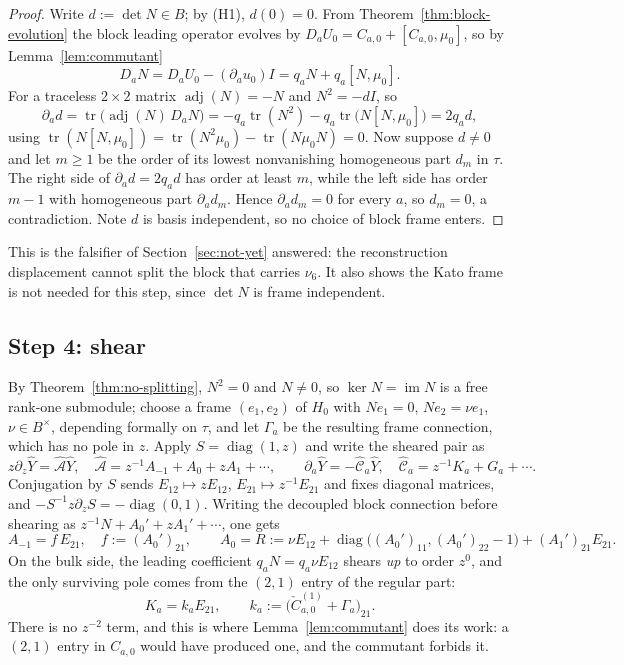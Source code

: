 \documentclass[11pt]{article}
\theoremstyle{definition}
\theoremstyle{remark}
\begin{document}
\begin{proof}
Write $d:=\det N\in B$; by (H1), $d(0)=0$. From
Theorem~\ref{thm:block-evolution} the block leading operator evolves by
$D_aU_0=C_{a,0}+[C_{a,0},\mu_0]$, so by Lemma~\ref{lem:commutant}
\[
  D_aN=D_aU_0-(\partial_au_0)I=q_aN+q_a[N,\mu_0].
\]
For a traceless $2\times2$ matrix $\operatorname{adj}(N)=-N$ and
$N^2=-dI$, so
\[
  \partial_ad=\operatorname{tr}\bigl(\operatorname{adj}(N)\,D_aN\bigr)
  =-q_a\operatorname{tr}(N^2)-q_a\operatorname{tr}\bigl(N[N,\mu_0]\bigr)
  =2q_ad,
\]
using $\operatorname{tr}(N[N,\mu_0])=\operatorname{tr}(N^2\mu_0)
-\operatorname{tr}(N\mu_0N)=0$. Now suppose $d\ne0$ and let $m\ge1$ be the
order of its lowest nonvanishing homogeneous part $d_m$ in $\tau$. The right
side of $\partial_ad=2q_ad$ has order at least $m$, while the left side has
order $m-1$ with homogeneous part $\partial_ad_m$. Hence $\partial_ad_m=0$ for
every $a$, so $d_m=0$, a contradiction. Note $d$ is basis independent, so no
choice of block frame enters.
\end{proof}

This is the falsifier of Section~\ref{sec:not-yet} answered: the reconstruction
displacement cannot split the block that carries $\nu_6$. It also shows the
Kato frame is not needed for this step, since $\det N$ is frame independent.

\subsection*{Step 4: shear}

By Theorem~\ref{thm:no-splitting}, $N^2=0$ and $N\ne0$, so $\ker N=\operatorname{im}N$
is a free rank-one submodule; choose a frame $(e_1,e_2)$ of $H_0$ with
$Ne_1=0$, $Ne_2=\nu e_1$, $\nu\in B^\times$, depending formally on $\tau$, and
let $\Gamma_a$ be the resulting frame connection, which has no pole in $z$.
Apply $S=\operatorname{diag}(1,z)$ and write the sheared pair as
\[
  z\partial_z\widehat Y=\widehat{\mathcal A}\widehat Y,\quad
  \widehat{\mathcal A}=z^{-1}A_{-1}+A_0+zA_1+\cdots,
  \qquad
  \partial_a\widehat Y=-\widehat{\mathcal C}_a\widehat Y,\quad
  \widehat{\mathcal C}_a=z^{-1}K_a+G_a+\cdots.
\]
Conjugation by $S$ sends $E_{12}\mapsto zE_{12}$, $E_{21}\mapsto z^{-1}E_{21}$
and fixes diagonal matrices, and $-S^{-1}z\partial_zS=-\operatorname{diag}(0,1)$.
Writing the decoupled block connection before shearing as
$z^{-1}N+A_0'+zA_1'+\cdots$, one gets
\[
  A_{-1}=f\,E_{21},\quad f:=(A_0')_{21},
  \qquad
  A_0=R:=\nu E_{12}+\operatorname{diag}\bigl((A_0')_{11},(A_0')_{22}-1\bigr)
        +(A_1')_{21}E_{21}.
  \tag{8.2}
  \label{eq:sheared-data}
\]
On the bulk side, the leading coefficient $q_aN=q_a\nu E_{12}$ shears
\emph{up} to order $z^0$, and the only surviving pole comes from the $(2,1)$
entry of the regular part:
\[
  K_a=k_aE_{21},
  \qquad
  k_a:=\bigl(\check C^{(1)}_{a,0}+\Gamma_a\bigr)_{21}.
  \tag{8.3}
  \label{eq:sheared-bulk}
\]
There is no $z^{-2}$ term, and this is where Lemma~\ref{lem:commutant} does its
work: a $(2,1)$ entry in $C_{a,0}$ would have produced one, and the commutant
forbids it.
\end{document}
